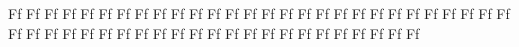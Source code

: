 \documentclass{worksheet}
\begin{document}
\begin{drillsheet}
\calligra
Ff Ff Ff Ff Ff Ff Ff Ff Ff Ff Ff Ff Ff Ff Ff Ff Ff Ff Ff Ff Ff Ff Ff Ff Ff Ff Ff Ff Ff Ff Ff Ff Ff Ff Ff Ff Ff Ff Ff Ff Ff Ff Ff Ff Ff Ff Ff Ff Ff Ff Ff
\end{drillsheet}
\end{document}
